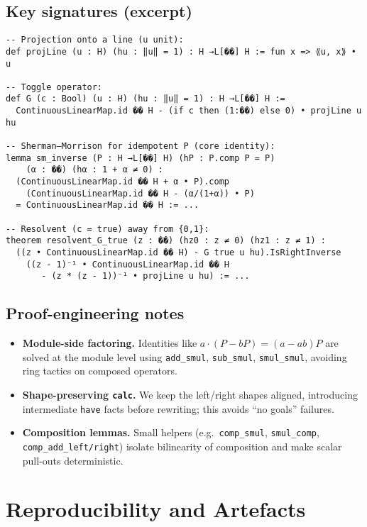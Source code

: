 \documentclass[11pt]{article}
\theoremstyle{definition}
\begin{document}
\subsection*{Key signatures (excerpt)}
\begin{lstlisting}
-- Projection onto a line (u unit):
def projLine (u : H) (hu : ‖u‖ = 1) : H →L[��] H := fun x => ⟪u, x⟫ • u

-- Toggle operator:
def G (c : Bool) (u : H) (hu : ‖u‖ = 1) : H →L[��] H :=
  ContinuousLinearMap.id �� H - (if c then (1:��) else 0) • projLine u hu

-- Sherman–Morrison for idempotent P (core identity):
lemma sm_inverse (P : H →L[��] H) (hP : P.comp P = P)
    (α : ��) (hα : 1 + α ≠ 0) :
  (ContinuousLinearMap.id �� H + α • P).comp
    (ContinuousLinearMap.id �� H - (α/(1+α)) • P)
  = ContinuousLinearMap.id �� H := ...

-- Resolvent (c = true) away from {0,1}:
theorem resolvent_G_true (z : ��) (hz0 : z ≠ 0) (hz1 : z ≠ 1) :
  ((z • ContinuousLinearMap.id �� H) - G true u hu).IsRightInverse
    ((z - 1)⁻¹ • ContinuousLinearMap.id �� H
       - (z * (z - 1))⁻¹ • projLine u hu) := ...
\end{lstlisting}

\subsection*{Proof-engineering notes}
\begin{itemize}
\item \textbf{Module-side factoring.} Identities like $a\cdot(P-bP)=(a-ab)P$ are solved at the module level using \texttt{add\_smul}, \texttt{sub\_smul}, \texttt{smul\_smul}, avoiding ring tactics on composed operators.
\item \textbf{Shape-preserving \texttt{calc}.} We keep the left/right shapes aligned, introducing intermediate \texttt{have} facts before rewriting; this avoids ``no goals'' failures.
\item \textbf{Composition lemmas.} Small helpers (e.g.\ \texttt{comp\_smul}, \texttt{smul\_comp}, \texttt{comp\_add\_left/right}) isolate bilinearity of composition and make scalar pull-outs deterministic.
\end{itemize}

\section{Reproducibility and Artefacts}\label{sec:artefacts}
\end{document}

